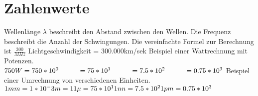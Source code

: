 
{\bfseries\Huge{}}
\begin{figure}
\end{figure}        
\part[]{Zahlenwerte}
Wellenlänge $\lambda$ beschreibt den Abstand zwischen den Wellen.\newline
Die Frequenz beschreibt die Anzahl der Schwingungen. \newline
Die vereinfachte Formel zur Berechnung ist $ \frac{300}{MHz} $
Lichtgeschwindigkeit = 300.000km/sek \newline
\vskip0.4cm
Beispiel einer Wattrechnung mit Potenzen.\newline
\begin{math}
    750W = 750*10^0 \newline
    \hspace*{0.98cm} = 75 *10^1\newline
    \hspace*{0.98cm} = 7.5 * 10^2\newline
    \hspace*{0.98cm} = 0.75 * 10^3 \newline
\end{math}
\vskip0.4cm
Beispiel einer Umrechnung von verschiedenen Einheiten. \newline
\begin{math}
    1mm = 1*10^-3m = 1 \newline
    1\mu = 75 *10^1\newline
    1nn = 7.5 * 10^2\newline
    1pm = 0.75 * 10^3 \newline
\end{math}